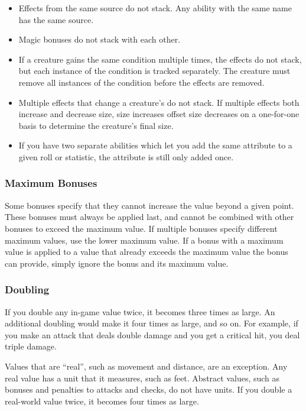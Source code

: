             \begin{itemize}
                \item Effects from the same source do not stack. Any ability with the same name has the same source.
                \item Magic bonuses do not stack with each other.
                \item If a creature gains the same condition multiple times, the effects do not stack, but each instance of the condition is tracked separately.
                    The creature must remove all instances of the condition before the effects are removed.
                \item Multiple effects that change a creature's  do not stack.
                    If multiple effects both increase and decrease size, size increases offset size decreases on a one-for-one basis to determine the creature's final size.
                \item If you have two separate abilities which let you add the same attribute to a given roll or statistic, the attribute is still only added once.
            \end{itemize}

        \subsubsection{Maximum Bonuses}\label{Ability Limits}
            Some bonuses specify that they cannot increase the value beyond a given point.
            These bonuses must always be applied last, and cannot be combined with other bonuses to exceed the maximum value.
            If multiple bonuses specify different maximum values, use the lower maximum value.
            If a bonus with a maximum value is applied to a value that already exceeds the maximum value the bonus can provide, simply ignore the bonus and its maximum value.

        \subsubsection{Doubling}\label{Doubling}
            If you double any in-game value twice, it becomes three times as large. An additional doubling would make it four times as large, and so on. For example, if you make an attack that deals double damage and you get a critical hit, you deal triple damage.

             Values that are ``real'', such as movement and distance, are an exception.
            Any real value has a unit that it measures, such as feet.
            Abstract values, such as bonuses and penalties to attacks and checks, do not have units.
            If you double a real-world value twice, it becomes four times as large.

